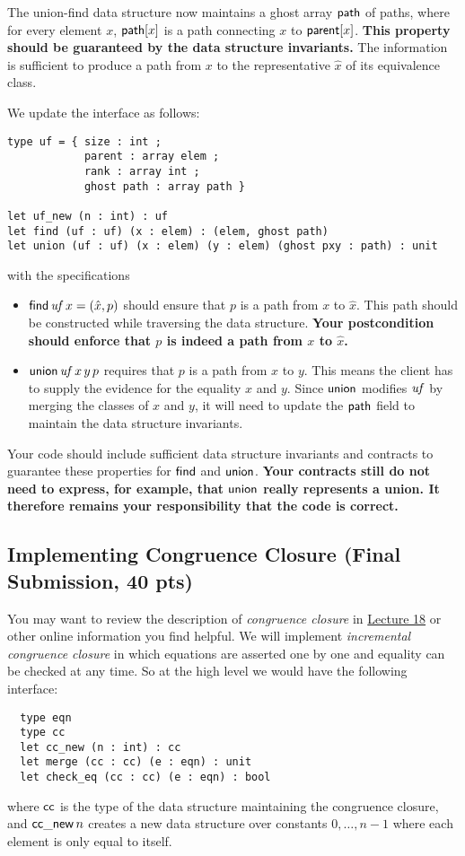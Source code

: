 \documentclass[11pt]{article}
\newcommand{\lecurl}{http://www.cs.cmu.edu/~15414/s22}
\begin{document}
The union-find data structure now maintains a ghost array $\mathsf{path}$
of paths, where for every element $x$, $\mathsf{path}[x]$ is a path
connecting $x$ to $\mathsf{parent}[x]$.  \textbf{This property should be
  guaranteed by the data structure invariants.}  The information is
sufficient to produce a path from $x$ to the representative $\hat{x}$
of its equivalence class.

\begin{task}[25 pts]
\label{task:path}
We update the interface as follows:
\begin{lstlisting}
type uf = { size : int ;
            parent : array elem ;
            rank : array int ;
            ghost path : array path }

let uf_new (n : int) : uf
let find (uf : uf) (x : elem) : (elem, ghost path)
let union (uf : uf) (x : elem) (y : elem) (ghost pxy : path) : unit
\end{lstlisting}
with the specifications
\begin{itemize}
\item $\mathsf{find}\, \mathit{uf}\, x = (\hat{x}, p)$ should ensure that $p$
  is a path from $x$ to $\hat{x}$.  This path should be constructed
  while traversing the data structure.  \textbf{Your postcondition should
  enforce that $p$ is indeed a path from $x$ to $\hat{x}$.}
\item $\mathsf{union}\, \mathit{uf}\, x\, y\, p$ requires that $p$ is a path from
  $x$ to $y$.  This means the client has to supply the evidence for the
  equality $x$ and $y$.  Since $\mathsf{union}$ modifies $\mathit{uf}$ by merging
  the classes of $x$ and $y$, it will need to update the $\mathsf{path}$
  field to maintain the data structure invariants.
\end{itemize}
Your code should include sufficient data structure invariants and
contracts to guarantee these properties for $\mathsf{find}$ and
$\mathsf{union}$.  \textbf{Your contracts still do not need to express, for
  example, that $\mathsf{union}$ really represents a union.  It therefore
  remains your responsibility that the code is correct.}
\end{task}

\subsection{Implementing Congruence Closure (Final Submission, 40 pts)}

You may want to review the description of \emph{congruence closure} in
\href{\lecurl/lectures/18-array-proc.pdf}{Lecture 18} or other online
information you find helpful.  We will implement \emph{incremental
  congruence closure} in which equations are asserted one by one
and equality can be checked at any time.  So at the high level
we would have the following interface:
\begin{lstlisting}
  type eqn
  type cc
  let cc_new (n : int) : cc
  let merge (cc : cc) (e : eqn) : unit
  let check_eq (cc : cc) (e : eqn) : bool
\end{lstlisting}
where $\mathsf{cc}$ is the type of the data structure maintaining the
congruence closure, and $\mathsf{cc\_new}\, n$ creates a new data structure over
constants $0, \ldots, n-1$ where each element is only equal to itself.
\end{document}

